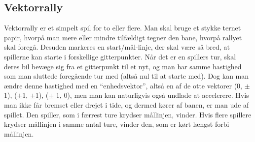 \subsection{Vektorrally}
Vektorrally er et simpelt spil for to eller flere. Man skal bruge et stykke ternet papir, hvorpå man mere eller mindre tilfældigt tegner den bane, hvorpå rallyet skal foregå. Desuden markeres en start/mål-linje, der skal være så bred, at spillerne kan starte i forskellige gitterpunkter. Når det er en spillers tur, skal deres bil bevæge sig fra et gitterpunkt til et nyt, og man har samme hastighed som man sluttede foregående tur med (altså nul til at starte med). Dog kan man ændre denne hastighed med en ``enhedsvektor'', altså en af de otte vektorer (0, $\pm$1), ($\pm$1, $\pm$1), ($\pm$ 1, 0), men man kan naturligvis også undlade at accelerere. Hvis man ikke får bremset eller drejet i tide, og dermed kører af banen, er man ude af spillet. Den spiller, som i færrest ture krydser mållinjen, vinder. Hvis flere spillere krydser mållinjen i samme antal ture, vinder den, som er kørt længst forbi mållinjen.

\vfill
{}
\vfill

\newpage